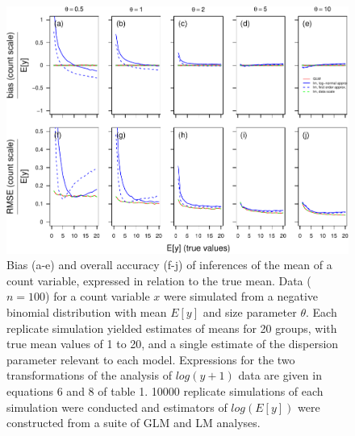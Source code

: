 \documentclass[]{article}
\begin{document}
\begin{figure}[h]

{\centering \includegraphics{revisiting_count_data_advice_files/figure-latex/SupplementRelativeScale-1} 

}

\caption{Bias (a-e) and overall accuracy (f-j) of inferences of the mean of a count variable, expressed in relation to the true mean.  Data ($n=100$) for a count variable $x$ were simulated from a negative binomial distribution with mean $E[y]$ and size parameter $\theta$.  Each replicate simulation yielded estimates of means for 20 groups, with true mean values of 1 to 20, and a single estimate of the dispersion parameter relevant to each model.  Expressions for the two transformations of the analysis of $log(y+1)$ data are given in equations 6 and 8 of table 1. 10000 replicate simulations of each simulation were conducted and estimators of $log(E[y])$ were constructed from a suite of GLM and LM analyses.}\label{fig:SupplementRelativeScale}
\end{figure}
\end{document}
